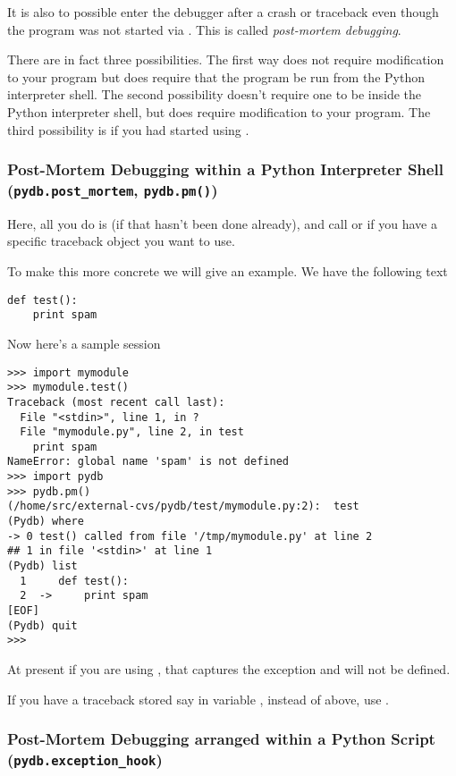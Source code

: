 It is also to possible enter the debugger after a crash or traceback
even though the program was not started via . This is
called \emph{post-mortem debugging}.

There are in fact three possibilities. The first way does not require
modification to your program but does require that the program be run
from the Python interpreter shell. The second possibility doesn't
require one to be inside the Python interpreter shell, but does require
modification to your program. The third possibility is if you had
started using .

\subsubsection{Post-Mortem Debugging within a Python Interpreter Shell
({\tt pydb.post_mortem}, {\tt pydb.pm()})}

Here, all you do is  (if that hasn't been done
already), and call  or  if you
have a specific traceback object you want to use.

To make this more concrete we will give an example. We have the
following text 

\begin{verbatim}
def test():
    print spam
\end{verbatim}

Now here's a sample session

\begin{verbatim}
>>> import mymodule
>>> mymodule.test()
Traceback (most recent call last):
  File "<stdin>", line 1, in ?
  File "mymodule.py", line 2, in test
    print spam
NameError: global name 'spam' is not defined
>>> import pydb
>>> pydb.pm()
(/home/src/external-cvs/pydb/test/mymodule.py:2):  test
(Pydb) where
-> 0 test() called from file '/tmp/mymodule.py' at line 2
## 1 in file '<stdin>' at line 1
(Pydb) list
  1     def test():
  2  ->     print spam
[EOF]
(Pydb) quit
>>> 
\end{verbatim}

At present if you are using , that captures the
exception and  will not be defined.

If you have a traceback stored say in variable , instead of 
 above, use .

\subsubsection{Post-Mortem Debugging arranged within a Python Script
  ({\tt pydb.exception_hook})}

